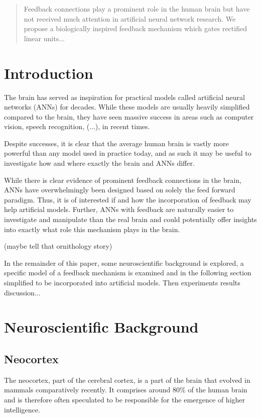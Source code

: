 \documentclass{article}
\begin{document}
\begin{abstract} 
Feedback connections play a prominent role in the human brain but have not received much attention in artificial neural network research. We propose a biologically inspired feedback mechanism which gates rectified linear units...\end{abstract} 

\section{Introduction}
\label{introduction}
The brain has served as inspiration for practical models called artificial neural networks (ANNs) for decades. While these models are usually heavily simplified compared to the brain, they have seen massive success in areas such as computer vision, speech recognition, (...), in recent times. 

Despite successes, it is clear that the average human brain is vastly more powerful than any model used in practice today, and as such it may be useful to investigate how and where exactly the brain and ANNs differ. 

While there is clear evidence of prominent feedback connections in the brain, ANNs have overwhelmingly been designed based on solely the feed forward paradigm. Thus, it is of interested if and how the incorporation of feedback may help artificial models. Further, ANNs with feedback are naturally easier to investigate and manipulate than the real brain and could potentially offer insights into exactly what role this mechanism plays in the brain. 

(maybe tell that ornithology story)

In the remainder of this paper, some neuroscientific background is explored, a specific model of a feedback mechanism is examined and in the following section simplified to be incorporated into artificial models. Then experiments results discussion... 


\section{Neuroscientific Background} 
 
\subsection{Neocortex}
The neocortex, part of the cerebral cortex, is a part of the brain that evolved in mammals comparatively recently. It comprises around 80\% of the human brain \cite{markram2004} and is therefore often speculated to be responsible for the emergence of higher intelligence. 
\end{document}
